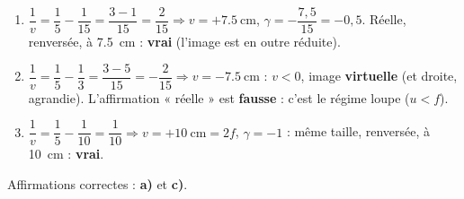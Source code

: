 \documentclass[11pt,a4paper]{article}
\begin{document}
\begin{corrige}
\begin{enumerate}[label=\alph*)]
  \item $\dfrac{1}{v}=\dfrac{1}{5}-\dfrac{1}{15}=\dfrac{3-1}{15}=\dfrac{2}{15}\Rightarrow v=+\qty{7.5}{\cm}$,
        $\gamma=-\dfrac{7{,}5}{15}=-0{,}5$. Réelle, renversée, à \qty{7.5}{\cm} : \textbf{vrai}
        (l'image est en outre réduite).
  \item $\dfrac{1}{v}=\dfrac{1}{5}-\dfrac{1}{3}=\dfrac{3-5}{15}=-\dfrac{2}{15}\Rightarrow v=-\qty{7.5}{\cm}$ :
        $v<0$, image \textbf{virtuelle} (et droite, agrandie). L'affirmation « réelle » est
        \textbf{fausse} : c'est le régime loupe ($u<f$).
  \item $\dfrac{1}{v}=\dfrac{1}{5}-\dfrac{1}{10}=\dfrac{1}{10}\Rightarrow v=+\qty{10}{\cm}=2f$,
        $\gamma=-1$ : même taille, renversée, à \qty{10}{\cm} : \textbf{vrai}.
\end{enumerate}
Affirmations correctes : \textbf{a)} et \textbf{c)}.
\end{corrige}
\end{document}
